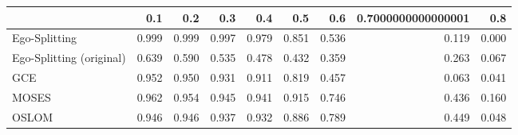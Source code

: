 \begin{tabular}{lrrrrrrrr}
\toprule
{} &   0.1 &   0.2 &   0.3 &   0.4 &   0.5 &   0.6 & 0.7000000000000001 &   0.8 \\
\midrule
Ego-Splitting            & 0.999 & 0.999 & 0.997 & 0.979 & 0.851 & 0.536 &              0.119 & 0.000 \\
Ego-Splitting (original) & 0.639 & 0.590 & 0.535 & 0.478 & 0.432 & 0.359 &              0.263 & 0.067 \\
GCE                      & 0.952 & 0.950 & 0.931 & 0.911 & 0.819 & 0.457 &              0.063 & 0.041 \\
MOSES                    & 0.962 & 0.954 & 0.945 & 0.941 & 0.915 & 0.746 &              0.436 & 0.160 \\
OSLOM                    & 0.946 & 0.946 & 0.937 & 0.932 & 0.886 & 0.789 &              0.449 & 0.048 \\
\bottomrule
\end{tabular}

